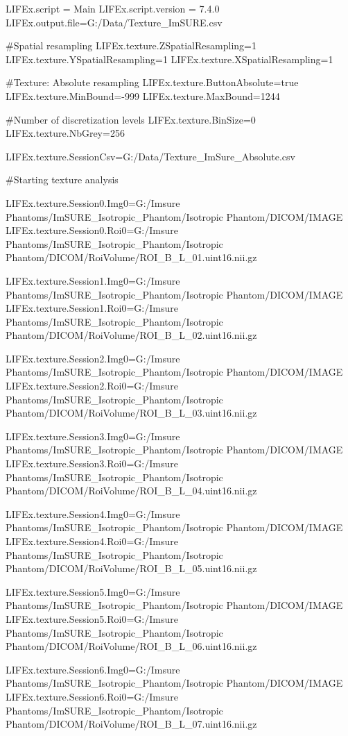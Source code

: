 LIFEx.script = Main
LIFEx.script.version = 7.4.0
LIFEx.output.file=G:/Data/Texture_ImSURE.csv

#Spatial resampling
LIFEx.texture.ZSpatialResampling=1
LIFEx.texture.YSpatialResampling=1
LIFEx.texture.XSpatialResampling=1

#Texture: Absolute resampling
LIFEx.texture.ButtonAbsolute=true
LIFEx.texture.MinBound=-999
LIFEx.texture.MaxBound=1244

#Number of discretization levels
LIFEx.texture.BinSize=0
LIFEx.texture.NbGrey=256


LIFEx.texture.SessionCsv=G:/Data/Texture_ImSure_Absolute.csv

#Starting texture analysis

LIFEx.texture.Session0.Img0=G:/Imsure Phantoms/ImSURE_Isotropic_Phantom/Isotropic Phantom/DICOM/IMAGE
LIFEx.texture.Session0.Roi0=G:/Imsure Phantoms/ImSURE_Isotropic_Phantom/Isotropic Phantom/DICOM/RoiVolume/ROI_B_L_01.uint16.nii.gz

LIFEx.texture.Session1.Img0=G:/Imsure Phantoms/ImSURE_Isotropic_Phantom/Isotropic Phantom/DICOM/IMAGE
LIFEx.texture.Session1.Roi0=G:/Imsure Phantoms/ImSURE_Isotropic_Phantom/Isotropic Phantom/DICOM/RoiVolume/ROI_B_L_02.uint16.nii.gz

LIFEx.texture.Session2.Img0=G:/Imsure Phantoms/ImSURE_Isotropic_Phantom/Isotropic Phantom/DICOM/IMAGE
LIFEx.texture.Session2.Roi0=G:/Imsure Phantoms/ImSURE_Isotropic_Phantom/Isotropic Phantom/DICOM/RoiVolume/ROI_B_L_03.uint16.nii.gz

LIFEx.texture.Session3.Img0=G:/Imsure Phantoms/ImSURE_Isotropic_Phantom/Isotropic Phantom/DICOM/IMAGE
LIFEx.texture.Session3.Roi0=G:/Imsure Phantoms/ImSURE_Isotropic_Phantom/Isotropic Phantom/DICOM/RoiVolume/ROI_B_L_04.uint16.nii.gz

LIFEx.texture.Session4.Img0=G:/Imsure Phantoms/ImSURE_Isotropic_Phantom/Isotropic Phantom/DICOM/IMAGE
LIFEx.texture.Session4.Roi0=G:/Imsure Phantoms/ImSURE_Isotropic_Phantom/Isotropic Phantom/DICOM/RoiVolume/ROI_B_L_05.uint16.nii.gz

LIFEx.texture.Session5.Img0=G:/Imsure Phantoms/ImSURE_Isotropic_Phantom/Isotropic Phantom/DICOM/IMAGE
LIFEx.texture.Session5.Roi0=G:/Imsure Phantoms/ImSURE_Isotropic_Phantom/Isotropic Phantom/DICOM/RoiVolume/ROI_B_L_06.uint16.nii.gz

LIFEx.texture.Session6.Img0=G:/Imsure Phantoms/ImSURE_Isotropic_Phantom/Isotropic Phantom/DICOM/IMAGE
LIFEx.texture.Session6.Roi0=G:/Imsure Phantoms/ImSURE_Isotropic_Phantom/Isotropic Phantom/DICOM/RoiVolume/ROI_B_L_07.uint16.nii.gz

